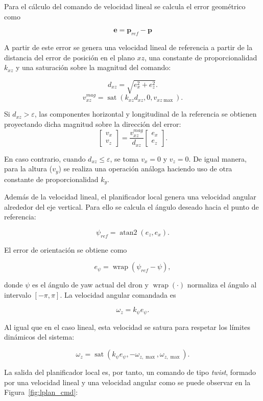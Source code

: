 Para el cálculo del comando de velocidad lineal se calcula el error geométrico como

\[\mathbf{e} =\mathbf{p}_{ref} - \mathbf{p}\]

A partir de este error se genera una velocidad lineal de referencia a partir de la distancia del error de posición en el plano \(xz\), una constante de 
proporcionalidad \(k_{xz}\) y una saturación sobre la magnitud del comando:

\[d_{xz} =\sqrt{e_x^2 + e_z^2}.\]
\[v_{xz}^{mag} = \operatorname{sat}\left(k_{xz} d_{xz},0,v_{xz\max}\right).\]

Si \(d_{xz} > \varepsilon\), las componentes horizontal y longitudinal de la referencia se obtienen proyectando dicha magnitud sobre la dirección del error:
\[
\begin{bmatrix}
v_x\\
v_z
\end{bmatrix}
=
\frac{v_{xz}^{mag}}{d_{xz}}
\begin{bmatrix}
e_x\\
e_z
\end{bmatrix}.
\]

En caso contrario, cuando \(d_{xz} \le \varepsilon\), se toma \(v_x = 0\) y \(v_z = 0\). De igual manera, para la altura (\(v_y\)) se realiza una operación análoga haciendo uso de otra constante de proporcionalidad \(k_y\).

Además de la velocidad lineal, el planificador local genera una velocidad angular alrededor del eje vertical. Para ello se calcula el 
ángulo deseado hacia el punto de referencia:


\[
\psi_{ref} =
\operatorname{atan2}(e_z,e_x).
\]

El error de orientación se obtiene como

\[
e_{\psi} =
\operatorname{wrap}(\psi_{ref}-\psi),
\]

donde \(\psi\) es el ángulo de yaw actual del dron y \(\operatorname{wrap}(\cdot)\) normaliza el ángulo al intervalo \([-\pi,\pi]\). La velocidad angular comandada es

\[
\omega_z =
k_{\psi} e_{\psi}.
\]

Al igual que en el caso lineal, esta velocidad se satura para respetar los límites dinámicos del sistema:

\[
\omega_z =
\operatorname{sat}
\left(
k_{\psi} e_{\psi},
-\omega_{z,\max},
\omega_{z,\max}
\right).
\]

La salida del planificador local es, por tanto, un comando de tipo \textit{twist}, formado por una velocidad lineal y una velocidad 
angular como se puede observar en la Figura~\ref{fig:lplan_cmd}:

